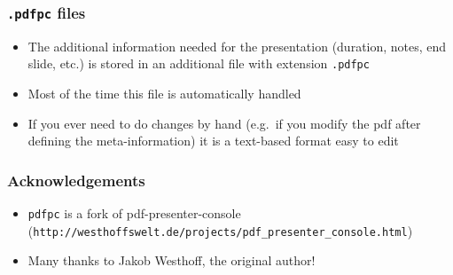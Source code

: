 \documentclass{beamer}
\newcommand{\pdfpc}{\texttt{pdfpc}\xspace}
\newcommand{\opt}[1]{\texttt{#1}\xspace}
\begin{document}
\begin{frame}
  \frametitle{\opt{.pdfpc} files}
  \begin{itemize}
    \item The additional information needed for the presentation (duration,
      notes, end slide, etc.) is stored in an additional file with extension
      \opt{.pdfpc}
    \item Most of the time this file is automatically handled
    \item If you ever need to do changes by hand (e.g.\ if you modify the pdf
      after defining the meta-information) it is a text-based format easy to
      edit
  \end{itemize}
\end{frame}

\begin{frame}[fragile]
  \frametitle{Acknowledgements}
  \begin{itemize}
    \item \pdfpc is a fork of pdf-presenter-console
      ({\footnotesize \verb+http://westhoffswelt.de/projects/pdf_presenter_console.html+})
    \item Many thanks to Jakob Westhoff, the original author!
  \end{itemize}
\end{frame}
\end{document}
